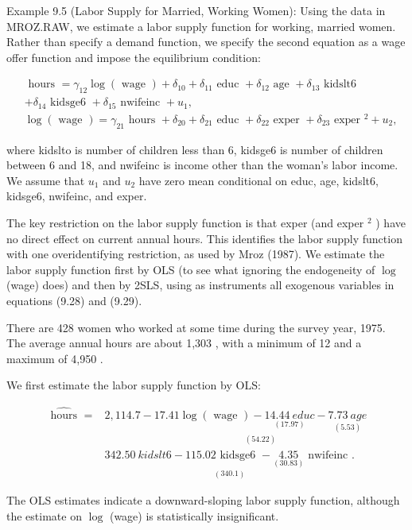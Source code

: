 \documentclass[10pt]{article}
\begin{document}
Example 9.5 (Labor Supply for Married, Working Women): Using the data in MROZ.RAW, we estimate a labor supply function for working, married women. Rather than specify a demand function, we specify the second equation as a wage offer function and impose the equilibrium condition:


\begin{align*}
& \text { hours }= \gamma_{12} \log (\text { wage })+\delta_{10}+\delta_{11} \text { educ }+\delta_{12} \text { age }+\delta_{13} \text { kidslt6 } \\
&+\delta_{14} \text { kidsge6 }+\delta_{15} \text { nwifeinc }+u_{1},  \tag{9.28}\\
& \log (\text { wage })=\gamma_{21} \text { hours }+\delta_{20}+\delta_{21} \text { educ }+\delta_{22} \text { exper }+\delta_{23} \text { exper }^{2}+u_{2}, \tag{9.29}
\end{align*}


where kidslto is number of children less than 6, kidsge6 is number of children between 6 and 18, and nwifeinc is income other than the woman's labor income. We assume that $u_{1}$ and $u_{2}$ have zero mean conditional on educ, age, kidslt6, kidsge6, nwifeinc, and exper.

The key restriction on the labor supply function is that exper (and exper ${ }^{2}$ ) have no direct effect on current annual hours. This identifies the labor supply function with one overidentifying restriction, as used by Mroz (1987). We estimate the labor supply function first by OLS (to see what ignoring the endogeneity of $\log$ (wage) does) and then by 2SLS, using as instruments all exogenous variables in equations (9.28) and (9.29).

There are 428 women who worked at some time during the survey year, 1975. The average annual hours are about 1,303 , with a minimum of 12 and a maximum of 4,950 .

We first estimate the labor supply function by OLS:

$$
\begin{aligned}
\widehat{\text { hours }}= & 2,114.7-\underset{(54.22)}{17.41 \log (\text { wage })-\underset{(17.97)}{14.44 ~ e d u c}-\underset{(5.53)}{7.73 ~ a g e}} \\
& \underset{(340.1)}{342.50 ~ k i d s l t 6-115.02 \text { kidsge6 }-\underset{(30.83)}{4.35} \text { nwifeinc } .}
\end{aligned}
$$

The OLS estimates indicate a downward-sloping labor supply function, although the estimate on $\log$ (wage) is statistically insignificant.
\end{document}
